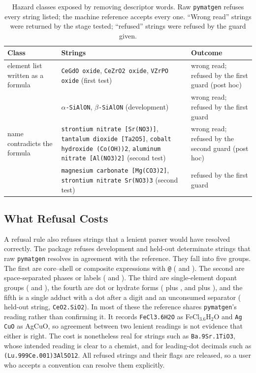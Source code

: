 \documentclass[10pt,journal]{IEEEtran}
\newcommand{\pmg}{\texttt{pymatgen}\xspace}
\begin{document}
\begin{table}[!t]
\centering
\caption{Hazard classes exposed by removing descriptor words. Raw \pmg refuses every string listed; the machine reference accepts every one. ``Wrong read'' strings were returned by the stage tested; ``refused'' strings were refused by the guard given.}
\label{tab:stage_hazards}
\footnotesize
\setlength{\tabcolsep}{3pt}
\begin{tabular}{@{}p{2.2cm}p{3.6cm}p{2.3cm}@{}}
\toprule
Class & Strings & Outcome \\
\midrule
element list written as a formula & \texttt{CeGdO oxide}, \texttt{CeZrO2 oxide}, \texttt{VZrPO oxide} (first test) & wrong read; refused by the first guard (post hoc) \\
 & \texttt{$\alpha$-SiAlON}, \texttt{$\beta$-SiAlON} (development) & wrong read; refused by the first guard \\
\midrule
name contradicts the formula & \texttt{strontium nitrate [Sr(NO3)]}, \texttt{tantalum dioxide [Ta2O5]}, \texttt{cobalt hydroxide (Co(OH))2}, \texttt{aluminum nitrate [Al(NO3)2]} (second test) & wrong read; refused by the second guard (post hoc) \\
 & \texttt{magnesium carbonate [Mg(CO3)2]}, \texttt{strontium nitrate Sr(NO3)3} (second test) & refused by the first guard \\
\bottomrule
\end{tabular}
\end{table}

\subsection{What Refusal Costs}
\label{sec:cost}
A refusal rule also refuses strings that a lenient parser would have resolved correctly. The package refuses \DevCost{} development and \HoCost{} held-out determinate strings that raw \pmg resolves in agreement with the reference. They fall into five groups. The first are core--shell or composite expressions with \texttt{@} (\DevCostAt{} and \HoCostAt). The second are space-separated phases or labels (\DevCostSpace{} and \HoCostSpace). The third are single-element dopant groups (\DevCostGroup{} and \HoCostGroup), the fourth are dot or hydrate forms (\DevCostDot{} plus \DevCostHydrate{}, and \HoCostDot{} plus \HoCostHydrate), and the fifth is a single adduct with a dot after a digit and an unconsumed separator (\HoCostOther{} held-out string, \texttt{CeO2.SiO2}). In most of these the reference shares \pmg's reading rather than confirming it. It records \texttt{FeCl3.6H2O} as FeCl$_{3.6}$H$_2$O and \texttt{Ag CuO} as AgCuO, so agreement between two lenient readings is not evidence that either is right. The cost is nonetheless real for strings such as \texttt{Ba.9Sr.1TiO3}, whose intended reading is clear to a chemist, and for leading-dot decimals such as \texttt{(Lu.999Ce.001)3Al5O12}. All refused strings and their flags are released, so a user who accepts a convention can resolve them explicitly.
\end{document}
